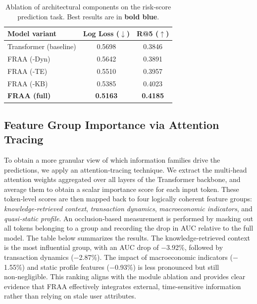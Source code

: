 \documentclass[10pt,twocolumn]{article}
\begin{document}
\begin{table}[t!]
\centering
\caption{Ablation of architectural components on the risk‑score prediction task. Best results are in \textcolor{bestresult}{\textbf{bold blue}}.\footnotemark[1]}
\begin{tabular}{lcc}
\toprule
\rowcolor{tablerowalt}
\textbf{Model variant} & \textbf{Log Loss (\(\downarrow\))} & \textbf{R@5 (\(\uparrow\))} \\
\midrule
Transformer (baseline)  & 0.5698 & 0.3846 \\
\rowcolor{tablerowalt}
FRAA (‑Dyn)             & 0.5642 & 0.3891 \\
FRAA (‑TE)              & 0.5510 & 0.3957 \\
\rowcolor{tablerowalt}
FRAA (‑KB)              & 0.5385 & 0.4023 \\
\textbf{FRAA (full)}    & \textcolor{bestresult}{\textbf{0.5163}} & \textcolor{bestresult}{\textbf{0.4185}} \\
\bottomrule
\end{tabular}
\end{table}

\subsection{Feature Group Importance via Attention Tracing}
To obtain a more granular view of which information families drive the predictions, we apply an attention‑tracing technique. We extract the multi‑head attention weights aggregated over all layers of the Transformer backbone, and average them to obtain a scalar importance score for each input token. These token‑level scores are then mapped back to four logically coherent feature groups: \emph{knowledge‑retrieved context}, \emph{transaction dynamics}, \emph{macroeconomic indicators}, and \emph{quasi‑static profile}. An occlusion‑based measurement is performed by masking out all tokens belonging to a group and recording the drop in AUC relative to the full model.
The table below summarizes the results. The knowledge‑retrieved context is the most influential group, with an AUC drop of \(-\)3.92\%, followed by transaction dynamics (\(-\)2.87\%). The impact of macroeconomic indicators (\(-\)1.55\%) and static profile features (\(-\)0.93\%) is less pronounced but still non‑negligible. This ranking aligns with the module ablation and provides clear evidence that FRAA effectively integrates external, time‑sensitive information rather than relying on stale user attributes.
\end{document}
